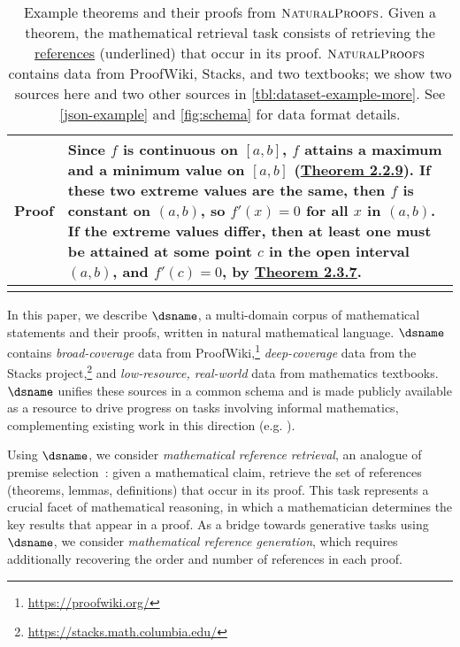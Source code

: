 \begin{table}[t]
\begin{center}
\begin{tabular}{l p{12cm}}
\hline
\textbf{Proof} & Since $f$ is continuous on $[a,b]$, $f$ attains a maximum and a minimum value on $[a,b]$ (\uline{Theorem 2.2.9}). If these two extreme values are the same, then $f$ is constant on $(a,b)$, so  $f'(x)=0$ for all $x$ in $(a,b)$. If the extreme values differ, then at least one must be attained at some point $c$ in the open interval  $(a,b)$, and $f'(c)=0$, by \uline{Theorem 2.3.7}.\\
\bottomrule
\addlinespace[0.2em] 
\end{tabular}
\end{center}
\caption{
    Example theorems and their proofs from $\textsc{NaturalProofs}$. 
    Given a theorem, the mathematical retrieval task consists of retrieving the \uline{references} (underlined) that occur in its proof.
    $\textsc{NaturalProofs}$ contains data from ProofWiki, Stacks, and two textbooks; we show two sources here and two other sources in \autoref{tbl:dataset-example-more}.
    See \autoref{json-example} and \autoref{fig:schema} for data format details.
}
\label{tbl:dataset-example}
\end{table}
In this paper, we describe $\dsname$, a multi-domain corpus of mathematical statements and their proofs, written in natural mathematical language.
$\dsname$ contains \textit{broad-coverage} data from ProofWiki,\footnote{\url{https://proofwiki.org/}} \textit{deep-coverage} data from the Stacks project,\footnote{\url{https://stacks.math.columbia.edu/}} and \textit{low-resource, real-world} data from mathematics textbooks.
$\dsname$ unifies these sources in a common schema and is made publicly available as a resource to drive progress on tasks involving informal mathematics, complementing existing work in this direction (e.g. \cite{ferreira2020natural,ferreira2020premise,wang2020exploration}).

Using $\dsname$, we consider \textit{mathematical reference retrieval}, an analogue of premise selection~\citep{alemi2016deepmath,ferreira2020premise}: given a mathematical claim, retrieve the set of references (theorems, lemmas, definitions) that occur in its proof.
This task represents a crucial facet of mathematical reasoning, in which a mathematician determines the key results that appear in a proof.
As a bridge towards generative tasks using $\dsname$, we consider \textit{mathematical reference generation}, which requires additionally recovering the order and number of references in each proof.

